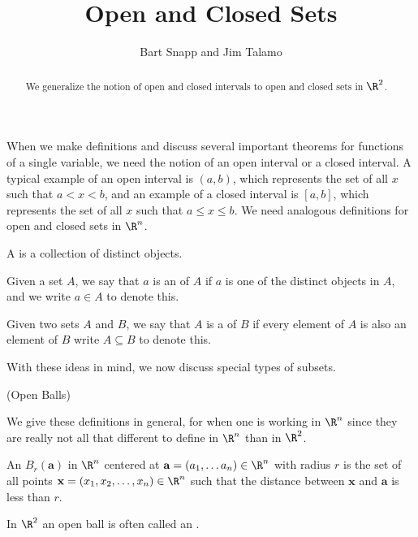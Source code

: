 \documentclass{ximera}
\author{Bart Snapp and Jim Talamo}
\title[Dig-In:]{Open and Closed Sets}
\newcommand{\point}[1]{\left(#1\right)} %
\begin{document}
\begin{abstract}
We generalize the notion of open and closed intervals to open and closed sets in $\R^2$.
\end{abstract}
\maketitle



When we make definitions and discuss several important theorems for functions of a single variable, 
we need the notion of an open interval or a closed interval.  A typical example of an open interval is $(a,b)$, which represents the set
of all $x$ such that $a<x<b$, and an example of a closed interval is $[a,b]$, which represents the set of all $x$ such that $a\leq x\leq
b$. We need analogous definitions for open and closed sets in $\R^n$.

\begin{definition} 
A  is a collection of distinct objects.

Given a set $A$, we say that $a$ is an  of $A$ if $a$ is one of the distinct objects in $A$, and we write $a \in A$ to denote this.

Given two sets $A$ and $B$, we say that $A$ is a  of $B$ if every element of $A$ is also an element of $B$ write $A \subseteq B$ to denote this.

\end{definition}

With these ideas in mind, we now discuss special types of subsets.

\begin{definition} (Open Balls)

  We give these definitions in general, for when one is working in
  $\R^n$ since they are really not all that different to define in $\R^n$ than in $\R^2$.

 An  $B_r(\mathbf{a})$ in $\R^n$ centered at $\mathbf{a} =\left(a_1,\dots a_n\right) \in \R^n$ with radius $r$ is the set of all  points $\mathbf{x} = \point{x_1,x_2,\dots,x_n} \in \R^n$ such that the distance between $\mathbf{x}$ and $\mathbf{a}$ is less than $r$.
    
    In $\R^2$ an open ball is often called an
    .
    \begin{image}
    \end{image}
 
 \end{definition}
 
\end{document}
